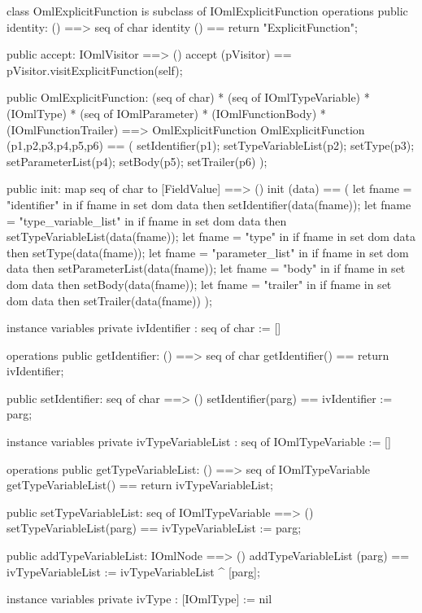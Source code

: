 \begin{vdm_al}
class OmlExplicitFunction is subclass of IOmlExplicitFunction
operations
  public identity: () ==> seq of char
  identity () == return "ExplicitFunction";

  public accept: IOmlVisitor ==> ()
  accept (pVisitor) == pVisitor.visitExplicitFunction(self);

  public OmlExplicitFunction:
      (seq of char) *
      (seq of IOmlTypeVariable) *
      (IOmlType) *
      (seq of IOmlParameter) *
      (IOmlFunctionBody) *
      (IOmlFunctionTrailer) ==> OmlExplicitFunction
  OmlExplicitFunction (p1,p2,p3,p4,p5,p6) == 
   ( setIdentifier(p1);
     setTypeVariableList(p2);
     setType(p3);
     setParameterList(p4);
     setBody(p5);
     setTrailer(p6) );

  public init: map seq of char to [FieldValue] ==> ()
  init (data) ==
    ( let fname = "identifier" in
        if fname in set dom data
        then setIdentifier(data(fname));
      let fname = "type_variable_list" in
        if fname in set dom data
        then setTypeVariableList(data(fname));
      let fname = "type" in
        if fname in set dom data
        then setType(data(fname));
      let fname = "parameter_list" in
        if fname in set dom data
        then setParameterList(data(fname));
      let fname = "body" in
        if fname in set dom data
        then setBody(data(fname));
      let fname = "trailer" in
        if fname in set dom data
        then setTrailer(data(fname)) );

instance variables
  private ivIdentifier : seq of char := []

operations
  public getIdentifier: () ==> seq of char
  getIdentifier() == return ivIdentifier;

  public setIdentifier: seq of char ==> ()
  setIdentifier(parg) == ivIdentifier := parg;

instance variables
  private ivTypeVariableList : seq of IOmlTypeVariable := []

operations
  public getTypeVariableList: () ==> seq of IOmlTypeVariable
  getTypeVariableList() == return ivTypeVariableList;

  public setTypeVariableList: seq of IOmlTypeVariable ==> ()
  setTypeVariableList(parg) == ivTypeVariableList := parg;

  public addTypeVariableList: IOmlNode ==> ()
  addTypeVariableList (parg) == ivTypeVariableList := ivTypeVariableList ^ [parg];

instance variables
  private ivType : [IOmlType] := nil


\end{vdm_al}
